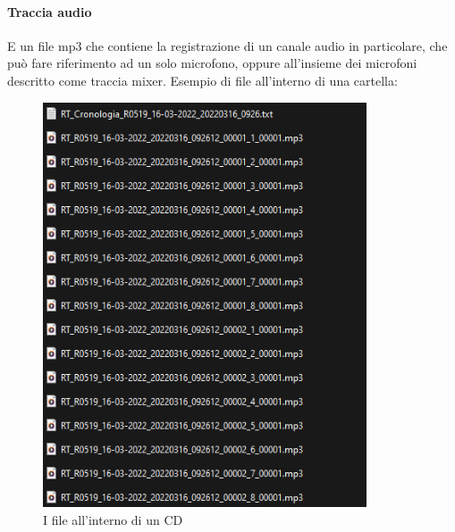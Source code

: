 \paragraph{Traccia audio}
E un file mp3 che contiene la registrazione di un canale audio in particolare, che può fare riferimento ad un solo microfono, oppure all'insieme dei microfoni descritto come \gls{traccia mixer}\glsfirstoccur.
Esempio di file all'interno di una cartella:
\begin{figure}[H]
  \centering
  \includegraphics[width=\textwidth,height=12cm]{immagini/CD-files.png}
  \caption{I file all'interno di un CD}
\end{figure}
